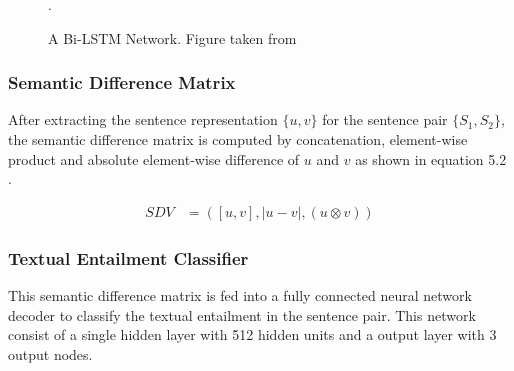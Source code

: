 \documentclass[12pt]{report} %
\begin{document}
	\begin{figure}[!tbp]
		\centering
		\caption{A Bi-LSTM Network. Figure taken from \cite{conneau2017supervised}}.
		\label{bilstm}
	\end{figure}
	
	\subsubsection{Semantic Difference Matrix}
	
	After extracting the sentence representation $\{u,v\}$  for the sentence pair $\{S_{1},S_{2}\}$, the semantic difference matrix is computed by concatenation, element-wise product and absolute element-wise difference of $u$ and $v$ as shown in equation 5.2 .
	
	\begin{align} 
	SDV & =([u,v],|u - v|,(u \otimes v)) 
	\end{align}
	
	\subsubsection{Textual Entailment Classifier}
	
	This semantic difference matrix is fed into a fully connected neural network decoder to classify the textual entailment in the sentence pair. This network consist of a single hidden layer with 512 hidden units and a output layer with 3 output nodes. 
	
\end{document}
